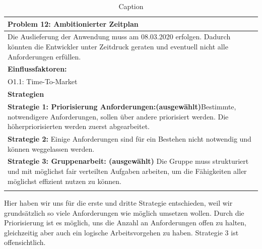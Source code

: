 \documentclass[enabledeprecatedfontcommands,fontsize=12pt,paper=a4,twoside]{scrartcl}
\begin{document}
\begin{table}[H]
    \centering
    \begin{tabular}{|p{15cm}|}
    \hline
          \textbf{Problem 12:} Ambitionierter Zeitplan
          \\ \hline
          Die Auslieferung der Anwendung muss am 08.03.2020 erfolgen. Dadurch könnten die Entwickler unter Zeitdruck geraten und eventuell nicht alle Anforderungen erfüllen.
          \\ \hline
          \textbf{Einflussfaktoren: } \\
          O1.1: Time-To-Market\\
          \hline
          \textbf{Strategien} \\ \hline
         \textbf{Strategie 1: Priorisierung Anforderungen:(ausgewählt)}Bestimmte, notwendigere Anforderungen, sollen über andere priorisiert werden. Die höherpriorisierten werden zuerst abgearbeitet. \\
          \textbf{Strategie 2:} Einige Anforderungen sind für ein Bestehen nicht notwendig und können weggelassen werden.\\
          \textbf{Strategie 3: Gruppenarbeit: (ausgewählt)} Die Gruppe muss strukturiert und mit möglichst fair verteilten Aufgaben arbeiten, um die Fähigkeiten aller möglichst effizient nutzen zu können. \\
          \\ \hline
    \end{tabular}
    \caption{Caption}
    \label{tab:my_label}
\end{table}
Hier haben wir uns für die erste und dritte Strategie entschieden, weil wir grundsätzlich so viele Anforderungen wie möglich umsetzen wollen. Durch die Priorisierung ist es möglich, uns die Anzahl an Anforderungen offen zu halten, gleichzeitig aber auch ein logische Arbeitsvorgehen zu haben. Strategie 3 ist offensichtlich. \\
\end{document}

